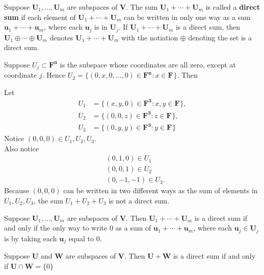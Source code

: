 \documentclass[11pt]{article} %
\newcommand\F[1]{\mathbf{F^{#1}}}
\newcommand\U{\mathbf{U}}
\renewcommand\u{\mathbf{u}}
\newcommand\V{\mathbf{V}}
\newcommand\W{\mathbf{W}}
\begin{document}
{
Suppose $\U_1, \ldots, \U_m$ are subspaces of $\V$.
\points
{The sum $\U_1 + \cdots + \U_m$ is called a \textbf{direct sum} if each element of $\U_1 + \cdots + \U_m$ can be written in only one way as a sum $\u_1 + \cdots + \u_m$, where each $\u_j$ is in $\U_j$.}
{If $\U_1 + \cdots + \U_m$ is a direct sum, then $\U_1 \oplus \cdots \oplus \U_m$ denotes $\U_1 + \cdots + \U_m$ with the notiation $\oplus$ denoting the set is a direct sum.}
}

{
Suppose $U_j \subset \F{n}$ is the subspace whose coordinates are all zero, except at coordinate $j$. Hence $U_2 = \{(0,x,0, \ldots, 0) \in \F{n}: x \in \F{}\}$. Then 
\mathdiv{\F{n} = U_1 + \cdots + U_n}
}

{
Let \begin{align*}
U_1 &= \{(x,y,0) \in \F{3} : x, y \in \F{}\}, \\
U_2 &= \{(0,0,z) \in \F{3} : z \in \F{}\}, \\
U_3 &= \{(0,y,y) \in \F{3} : y \in \F{}\} 
\end{align*}
Notice $(0, 0, 0) \in U_1, U_2, U_3$. \\
Also notice \begin{align*}
&(0, 1, 0) \in U_1 \\
&(0,0,1) \in U_2 \\ 
&(0, -1, -1) \in U_3.
\end{align*}
Because $(0,0,0)$ can be written in two different ways as the sum of elements in $U_1, U_2, U_3$,
the sum $U_1 + U_2 + U_3$ is not a direct sum.
}


{Suppose $\U_1, \ldots, \U_m$ are subspaces of $\V$. Then $\U_1 + \cdots + \U_m$ is a direct sum if and only if the only way to write 0 as a sum of $\u_1 + \cdots + \u_m$, where each $\u_j \in \U_j$ is by taking each $\u_j$ equal to 0.}
{}

{Suppose $\U$ and $\W$ are subspaces of $\V$. Then $\U + \W$ is a direct sum if and only if $\U \cap \W = \{0\}$}
{}
\end{document}

